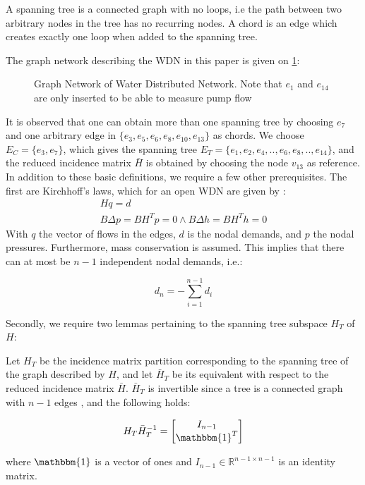 A spanning tree is a connected graph with no loops, i.e the path between two arbitrary nodes in the tree has no recurring nodes. A chord is an edge which creates exactly one loop when added to the spanning tree. 

The graph network describing the WDN in this paper is given on \cref{fig:tikzWDNGraph}:

\begin{figure}[h!]
	\centering
	\resizebox{\columnwidth}{!}{
		}
	\caption{Graph Network of Water Distributed Network. Note that $e_1$ and $e_{14} $ are only inserted to be able to measure pump flow}
	\label{fig:tikzWDNGraph}
\end{figure}
It is observed that one can obtain more than one spanning tree by choosing $ e_7 $ and one arbitrary edge in $ \{e_3,e_5,e_6,e_8,e_{10},e_{13}\} $ as chords. We choose 
$E_C=\{e_3,e_7\}$, which gives the spanning tree 
$E_T=\{e_1,e_2,e_4,..,e_6,e_8,..,e_{14}\}$, and the reduced incidence matrix $\bar{H}$ is obtained by choosing the node $ v_{13} $ as reference.\\

In addition to these basic definitions, we require a few other prerequisites. The first are Kirchhoff's laws, which for an open WDN are given by \cite{Jensen}:
\begin{gather}
	Hq = d \label{eq:KirchNodeLaw} \\
	B\Delta p = B H^T p = 0 \wedge B\Delta h = B H^T h = 0 \label{eq:KirchMeshLaw}
\end{gather} 
With $ q $ the vector of flows in the edges, $ d $ is the nodal demands, and $p$ the nodal pressures. Furthermore, mass conservation is assumed. This implies that there can at most be $n-1$ independent nodal demands, i.e.:

\begin{equation}\label{eq:MassConservation}
	d_n = -\sum_{i=1}^{n-1}d_i
\end{equation}

Secondly, we require two lemmas pertaining to the spanning tree subspace $H_T$ of $H$: \\

\begin{lemma}\label{lem:TreePartitionLemma}
	Let $H_T$ be the incidence matrix partition corresponding to the spanning tree of the graph described by $H$, and let $\bar{H}_T$ be its equivalent with respect to the reduced incidence matrix $\bar{H}$. $\bar{H}_T$ is invertible since a tree is a connected graph with $n-1$ edges \cite{Deo}, and the following holds:
	
	\begin{equation}\label{eq:TreePartitionLemma}
		H_T\bar{H}_T^{-1} = \begin{bmatrix} I_{n-1} \\ \mathbbm{1}^T	\end{bmatrix}
	\end{equation}
	
	where $\mathbbm{1}$ is a vector of ones and $I_{n-1} \in \mathbb{R}^{n-1 \times n-1}$ is an identity matrix.
\end{lemma}

